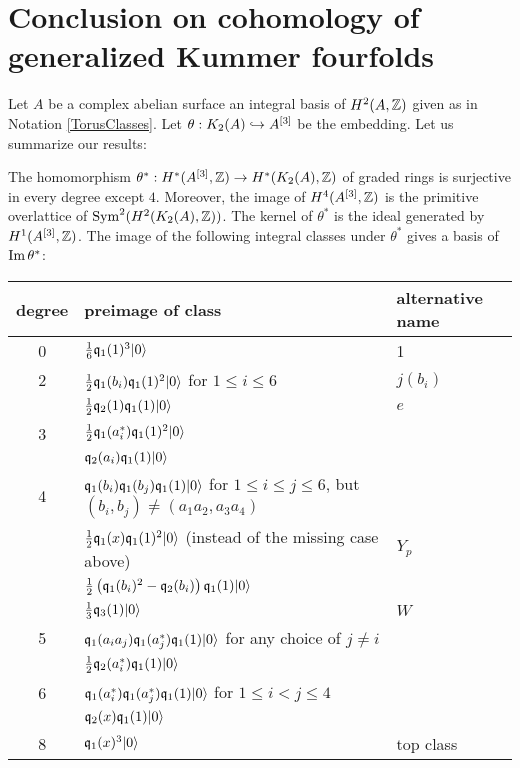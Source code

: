 \section{Conclusion on cohomology of generalized Kummer fourfolds}
Let $A$ be a complex abelian surface an integral basis of $H^2(A,\Z)$ given as in Notation \ref{TorusClasses}. Let $\theta: \kum{A}{2}\hookrightarrow A\hilb{3}$ be the embedding. 
Let us summarize our results:
\begin{theorem}\label{thetaTheorem}
The homomorphism $\theta^*:H^*(A\hilb{3},\Z)\rightarrow H^*(\kum{A}{2},\Z)$ of graded rings is surjective in every degree except $4$. Moreover, the image of $H^4(A\hilb{3},\Z)$ is the primitive overlattice of $\Sym^2(H^2(\kum{A}{2},\Z))$. 
The kernel of $\theta^*$ is the ideal generated by $H^1(A\hilb{3},\Z)$.
The image of the following integral classes under $\theta^*$ gives a basis of $\im\theta^*$:
\begin{center}
\begin{tabular}{c|l|l}
degree & preimage of class & alternative name  \\
\hline
0 & $\frac{1}{6} \q_1(1)^3\vac$ & 1 \\
\hline
2 &  $\frac{1}{2}\q_1(b_i) \q_1(1)^2\vac$ for $1\leq i\leq 6$ & $j(b_i)$ \\
 & $\frac{1}{2} \q_2(1)\q_1(1)\vac $  & $e$\\
\hline
3 & $\frac{1}{2}\q_1(a^*_i)\q_1(1)^2\vac$ & \\
  & $\q_2(a_i)\q_1(1)\vac$ & \\
\hline
4 & $\q_1(b_i)\q_1(b_j)\q_1(1)\vac$ for $1\leq i\leq j\leq 6$, but $(b_i,b_j)\neq(a_1a_2,a_3a_4)$ &\\
  & $\frac{1}{2}\q_1(x)\q_1(1)^2\vac$ (instead of the missing case above)  & $Y_p$\\
  & $\frac{1}{2}\left(\q_1(b_i)^2-\q_2(b_i)\right)\q_1(1)\vac$ & \\
  & $\frac{1}{3} \q_3(1)\vac$ & $W$ \\
\hline
5 & $\q_1(a_ia_j)\q_1(a_j^*)\q_1(1) \vac$ for any choice of $j\neq i$ &\\
  & $\frac{1}{2} \q_2(a^*_i)\q_1(1)\vac $ &\\
\hline
6 & $\q_1(a_i^*)\q_1(a_j^*)\q_1(1)\vac$ for $1\leq i< j\leq 4$ & \\
  & $\q_2(x)\q_1(1)\vac$ & \\
\hline
8 & $\q_1(x)^3\vac$ & top class
\end{tabular}
\end{center}
\end{theorem}
